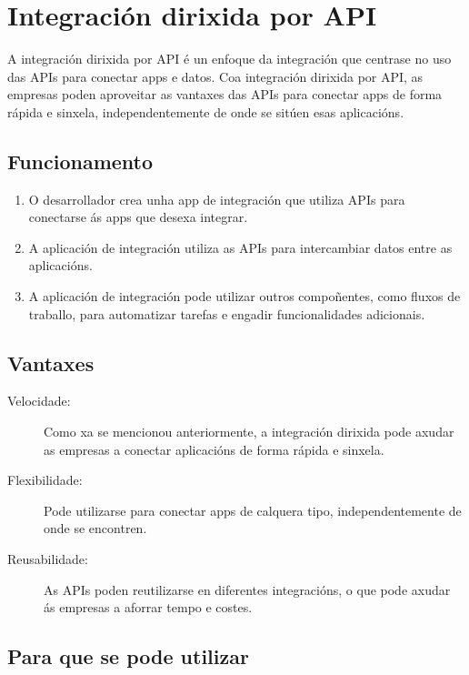 \section{Integración dirixida por API}

    A integración dirixida por API é un enfoque da integración que centrase no uso das APIs para conectar apps e datos. Coa integración dirixida por API, as empresas poden aproveitar as vantaxes das APIs para conectar apps de forma rápida e sinxela, independentemente de onde se sitúen esas aplicacións.
   
\subsection{Funcionamento}

\begin{enumerate}
    \item O desarrollador crea unha app de integración que utiliza APIs para conectarse ás apps que desexa integrar.
    \item A aplicación de integración utiliza as APIs para intercambiar datos entre as aplicacións.
    \item A aplicación de integración pode utilizar outros compoñentes, como fluxos de traballo, para automatizar tarefas e engadir funcionalidades adicionais.
\end{enumerate}

\subsection{Vantaxes}

\begin{description}
    \item[Velocidade:] Como xa se mencionou anteriormente, a integración dirixida pode axudar as empresas a conectar aplicacións de forma rápida e sinxela.
    \item[Flexibilidade:] Pode utilizarse para conectar apps de calquera tipo, independentemente de onde se encontren.
    \item[Reusabilidade:] As APIs poden reutilizarse en diferentes integracións, o que pode axudar ás empresas a aforrar tempo e costes. 
\end{description}

\subsection{Para que se pode utilizar}

